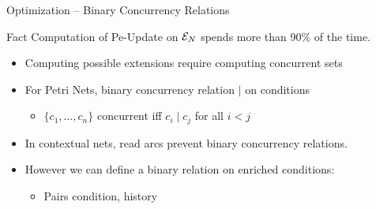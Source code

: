 \documentclass[table,red,11pt]{beamer}
\newcommand{\peupdate}{\mbox{\sc Pe-Update}}
\begin{document}
\begin{frame}[t]{Optimization -- Binary Concurrency Relations}
\begin{block}{Fact}
Computation of \peupdate{} on $\mathcal{E}_{N}$ spends more than 90\% of the time.
\end{block}

\begin{itemize}
\item<2-> Computing possible extensions require computing concurrent sets
\item<3-> For Petri Nets, \alert{binary} concurrency relation $\mid$ on
conditions
\begin{itemize}
\item<3-> $\{c_1, \ldots, c_n\}$ concurrent iff $c_i \mid c_j$ for all $i < j$
\end{itemize}

\item<4-> In contextual nets, read arcs prevent binary concurrency relations.

\item<5-> However we can define a binary relation on \alert{enriched conditions}:
\begin{itemize}
\item<5-> Pairs condition, history
\end{itemize}
\end{itemize}


\end{frame}
\end{document}
